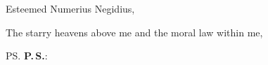 




\begin{hpxlttr}
  \opening{Esteemed Numerius Negidius,}

  \kant[1-2]

  \closing{The starry heavens above me and the moral law within me,}

  \ps{\textbf{P.\,S.}: \kant[42][1]}

\end{hpxlttr}
